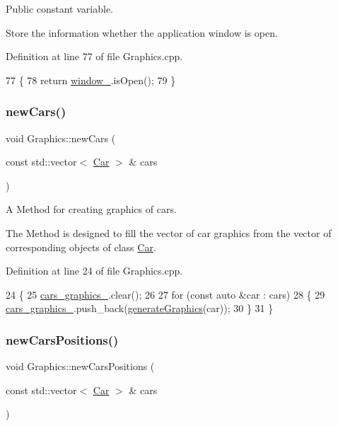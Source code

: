 Public constant variable. 

Store the information whether the application window is open. 

Definition at line 77 of file Graphics.\+cpp.


\begin{DoxyCode}
77                                         \{
78     \textcolor{keywordflow}{return} \hyperlink{classGraphics_ac760fe1abb0b648844c9f15afa087ef6}{window\_}.isOpen();
79 \}
\end{DoxyCode}
\mbox{\label{classGraphics_aee9384443642037cef28b28acddf86d3}} 
\subsubsection{\texorpdfstring{new\+Cars()}{newCars()}}
{\footnotesize\ttfamily void Graphics\+::new\+Cars (\begin{DoxyParamCaption}\item[{const std\+::vector$<$ \hyperlink{classCar}{Car} $>$ \&}]{cars }\end{DoxyParamCaption})}



A Method for creating graphics of cars. 

The Method is designed to fill the vector of car graphics from the vector of corresponding objects of class \hyperlink{classCar}{Car}. 

Definition at line 24 of file Graphics.\+cpp.


\begin{DoxyCode}
24                                                  \{
25     \hyperlink{classGraphics_a8be356ffe3ee47f915027361b6ae34ab}{cars\_graphics\_}.clear();
26 
27     \textcolor{keywordflow}{for} (\textcolor{keyword}{const} \textcolor{keyword}{auto} &car : cars)
28     \{
29         \hyperlink{classGraphics_a8be356ffe3ee47f915027361b6ae34ab}{cars\_graphics\_}.push\_back(\hyperlink{classGraphics_a504c1b9aa359dbe8b05f8879c1045610}{generateGraphics}(car));
30     \}
31 \}
\end{DoxyCode}
\mbox{\label{classGraphics_a5f2e6a6cc8dffc34b48e66df42046243}} 
\subsubsection{\texorpdfstring{new\+Cars\+Positions()}{newCarsPositions()}}
{\footnotesize\ttfamily void Graphics\+::new\+Cars\+Positions (\begin{DoxyParamCaption}\item[{const std\+::vector$<$ \hyperlink{classCar}{Car} $>$ \&}]{cars }\end{DoxyParamCaption})}



